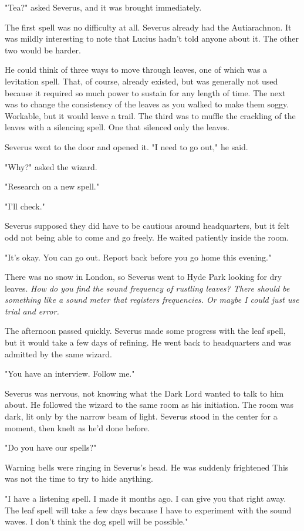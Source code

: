 "Tea?" asked Severus, and it was brought immediately.

The first spell was no difficulty at all. Severus already had the Autiarachnon. It was mildly interesting to note that Lucius hadn't told anyone about it. The other two would be harder.

He could think of three ways to move through leaves, one of which was a levitation spell. That, of course, already existed, but was generally not used because it required so much power to sustain for any length of time. The next was to change the consistency of the leaves as you walked to make them soggy. Workable, but it would leave a trail. The third was to muffle the crackling of the leaves with a silencing spell. One that silenced only the leaves.

Severus went to the door and opened it. "I need to go out," he said.

"Why?" asked the wizard.

"Research on a new spell."

"I'll check."

Severus supposed they did have to be cautious around headquarters, but it felt odd not being able to come and go freely. He waited patiently inside the room.

"It's okay. You can go out. Report back before you go home this evening."

There was no snow in London, so Severus went to Hyde Park looking for dry leaves. \emph{How do you find the sound frequency of rustling leaves? There should be something like a sound meter that registers frequencies. Or maybe I could just use trial and error.}

The afternoon passed quickly. Severus made some progress with the leaf spell, but it would take a few days of refining. He went back to headquarters and was admitted by the same wizard.

"You have an interview. Follow me."

Severus was nervous, not knowing what the Dark Lord wanted to talk to him about. He followed the wizard to the same room as his initiation. The room was dark, lit only by the narrow beam of light. Severus stood in the center for a moment, then knelt as he'd done before.

"Do you have our spells?"

Warning bells were ringing in Severus's head. He was suddenly frightened This was not the time to try to hide anything.

"I have a listening spell. I made it months ago. I can give you that right away. The leaf spell will take a few days because I have to experiment with the sound waves. I don't think the dog spell will be possible."

